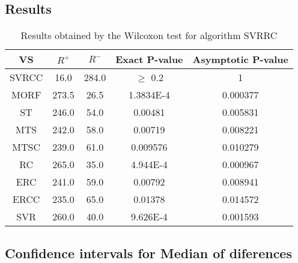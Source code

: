 \documentclass[a4paper,10pt]{article}
\begin{document}
\subsection{Results}

\begin{table}[!htp]
\centering\small
\begin{tabular}{
|c|c|c|c|c|}
\hline
 VS & $R^{+}$ & $R^{-}$ & Exact P-value & Asymptotic P-value \\ \hline 
SVRCC & 16.0 & 284.0 & $\geq$ 0.2 & 1\\ \hline 
MORF & 273.5 & 26.5 & 1.3834E-4 & 0.000377\\ \hline 
ST & 246.0 & 54.0 & 0.00481 & 0.005831\\ \hline 
MTS & 242.0 & 58.0 & 0.00719 & 0.008221\\ \hline 
MTSC & 239.0 & 61.0 & 0.009576 & 0.010279\\ \hline 
RC & 265.0 & 35.0 & 4.944E-4 & 0.000967\\ \hline 
ERC & 241.0 & 59.0 & 0.00792 & 0.008941\\ \hline 
ERCC & 235.0 & 65.0 & 0.01378 & 0.014572\\ \hline 
SVR & 260.0 & 40.0 & 9.626E-4 & 0.001593\\ \hline 

\end{tabular}
\caption{Results obtained by the Wilcoxon test for algorithm SVRRC}
\end{table}

\subsection{Confidence intervals for Median of diferences}
\end{document}
